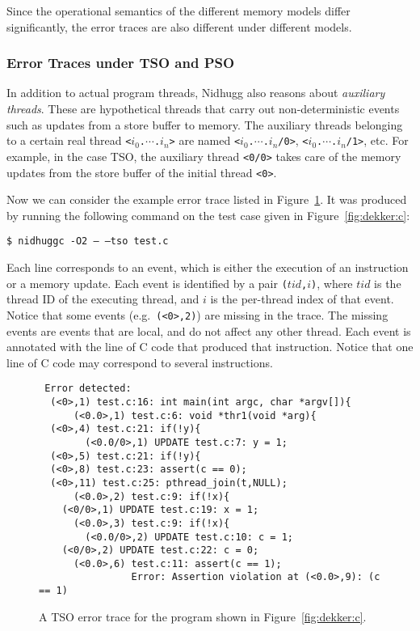 \documentclass[a4paper]{article}
\begin{document}
Since the operational semantics of the different memory models differ
significantly, the error traces are also different under different
models.

\subsubsection{Error Traces under TSO and PSO}

In addition to actual program threads, Nidhugg also reasons about
\emph{auxiliary threads}. These are hypothetical threads that carry
out non-deterministic events such as updates from a store buffer to
memory. The auxiliary threads belonging to a certain real thread
\texttt{<$i_0$.$\cdots$.$i_n$>} are named
\texttt{<$i_0$.$\cdots$.$i_n$/0>}, \texttt{<$i_0$.$\cdots$.$i_n$/1>},
etc. For example, in the case TSO, the auxiliary thread \texttt{<0/0>}
takes care of the memory updates from the store buffer of the initial
thread \texttt{<0>}.

Now we can consider the example error trace listed in
Figure~\ref{fig:ex:error:trace:dekker:tso}. It was produced by running the
following command on the test case given in Figure~\ref{fig:dekker:c}:

\vspace{5pt}
\noindent
\texttt{\$ nidhuggc -O2 -- --tso test.c}

\vspace{5pt}\noindent
%
Each line corresponds to an event, which is either the execution of an
instruction or a memory update. Each event is identified by a pair
\texttt{($tid$,$i$)}, where $tid$ is the thread ID of the executing
thread, and $i$ is the per-thread index of that event. Notice that
some events (e.g.\ \texttt{(<0>,2)}) are missing in the trace. The
missing events are events that are local, and do not affect any other
thread. Each event is annotated with the line of C code that produced
that instruction. Notice that one line of C code may correspond to
several instructions.

\begin{figure}
\begin{verbatim}
 Error detected:
  (<0>,1) test.c:16: int main(int argc, char *argv[]){
      (<0.0>,1) test.c:6: void *thr1(void *arg){
  (<0>,4) test.c:21: if(!y){
        (<0.0/0>,1) UPDATE test.c:7: y = 1;
  (<0>,5) test.c:21: if(!y){
  (<0>,8) test.c:23: assert(c == 0);
  (<0>,11) test.c:25: pthread_join(t,NULL);
      (<0.0>,2) test.c:9: if(!x){
    (<0/0>,1) UPDATE test.c:19: x = 1;
      (<0.0>,3) test.c:9: if(!x){
        (<0.0/0>,2) UPDATE test.c:10: c = 1;
    (<0/0>,2) UPDATE test.c:22: c = 0;
      (<0.0>,6) test.c:11: assert(c == 1);
                Error: Assertion violation at (<0.0>,9): (c == 1)
\end{verbatim}
  \caption{A TSO error trace for the program shown in
    Figure~\ref{fig:dekker:c}.}\label{fig:ex:error:trace:dekker:tso}
\end{figure}
\end{document}
